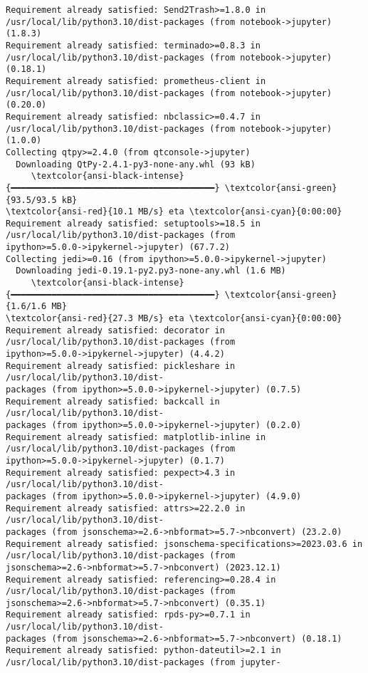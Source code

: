 \documentclass[11pt]{article}
\begin{document}
\begin{Verbatim}[commandchars=\\\{\}]
Requirement already satisfied: Send2Trash>=1.8.0 in
/usr/local/lib/python3.10/dist-packages (from notebook->jupyter) (1.8.3)
Requirement already satisfied: terminado>=0.8.3 in
/usr/local/lib/python3.10/dist-packages (from notebook->jupyter) (0.18.1)
Requirement already satisfied: prometheus-client in
/usr/local/lib/python3.10/dist-packages (from notebook->jupyter) (0.20.0)
Requirement already satisfied: nbclassic>=0.4.7 in
/usr/local/lib/python3.10/dist-packages (from notebook->jupyter) (1.0.0)
Collecting qtpy>=2.4.0 (from qtconsole->jupyter)
  Downloading QtPy-2.4.1-py3-none-any.whl (93 kB)
     \textcolor{ansi-black-intense}{━━━━━━━━━━━━━━━━━━━━━━━━━━━━━━━━━━━━━━━━} \textcolor{ansi-green}{93.5/93.5 kB}
\textcolor{ansi-red}{10.1 MB/s} eta \textcolor{ansi-cyan}{0:00:00}
Requirement already satisfied: setuptools>=18.5 in
/usr/local/lib/python3.10/dist-packages (from
ipython>=5.0.0->ipykernel->jupyter) (67.7.2)
Collecting jedi>=0.16 (from ipython>=5.0.0->ipykernel->jupyter)
  Downloading jedi-0.19.1-py2.py3-none-any.whl (1.6 MB)
     \textcolor{ansi-black-intense}{━━━━━━━━━━━━━━━━━━━━━━━━━━━━━━━━━━━━━━━━} \textcolor{ansi-green}{1.6/1.6 MB}
\textcolor{ansi-red}{27.3 MB/s} eta \textcolor{ansi-cyan}{0:00:00}
Requirement already satisfied: decorator in
/usr/local/lib/python3.10/dist-packages (from
ipython>=5.0.0->ipykernel->jupyter) (4.4.2)
Requirement already satisfied: pickleshare in /usr/local/lib/python3.10/dist-
packages (from ipython>=5.0.0->ipykernel->jupyter) (0.7.5)
Requirement already satisfied: backcall in /usr/local/lib/python3.10/dist-
packages (from ipython>=5.0.0->ipykernel->jupyter) (0.2.0)
Requirement already satisfied: matplotlib-inline in
/usr/local/lib/python3.10/dist-packages (from
ipython>=5.0.0->ipykernel->jupyter) (0.1.7)
Requirement already satisfied: pexpect>4.3 in /usr/local/lib/python3.10/dist-
packages (from ipython>=5.0.0->ipykernel->jupyter) (4.9.0)
Requirement already satisfied: attrs>=22.2.0 in /usr/local/lib/python3.10/dist-
packages (from jsonschema>=2.6->nbformat>=5.7->nbconvert) (23.2.0)
Requirement already satisfied: jsonschema-specifications>=2023.03.6 in
/usr/local/lib/python3.10/dist-packages (from
jsonschema>=2.6->nbformat>=5.7->nbconvert) (2023.12.1)
Requirement already satisfied: referencing>=0.28.4 in
/usr/local/lib/python3.10/dist-packages (from
jsonschema>=2.6->nbformat>=5.7->nbconvert) (0.35.1)
Requirement already satisfied: rpds-py>=0.7.1 in /usr/local/lib/python3.10/dist-
packages (from jsonschema>=2.6->nbformat>=5.7->nbconvert) (0.18.1)
Requirement already satisfied: python-dateutil>=2.1 in
/usr/local/lib/python3.10/dist-packages (from jupyter-

\end{Verbatim}
\end{document}
